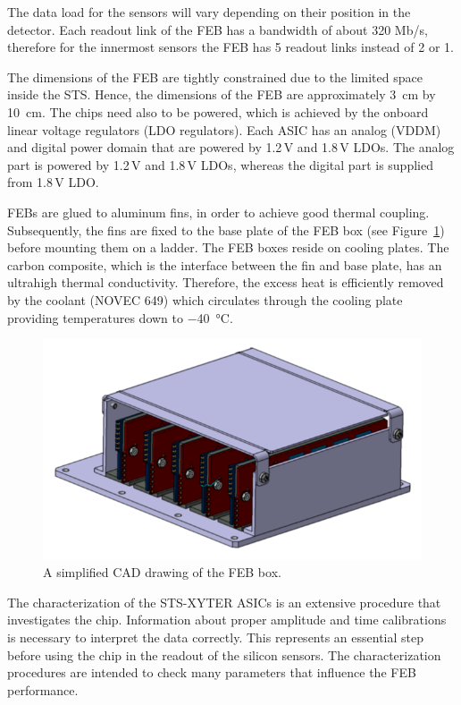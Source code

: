 The data load for the sensors will vary depending on their position in the detector. Each readout link of the \gls{FEB} has a bandwidth of about 320 Mb/s, therefore for the innermost sensors the \gls{FEB} has 5 readout links instead of 2 or 1. 

The dimensions of the \gls{FEB} are tightly constrained due to the limited space inside the \gls{STS}. Hence, the dimensions of the \gls{FEB} are approximately \SI{3}{\centi\metre} by \SI{10}{\centi\metre}. The chips need also to be powered, which is achieved by the onboard linear voltage regulators (\gls{LDO} regulators). Each \gls{ASIC} has an analog (VDDM) and digital power domain that are powered by 1.2\,V and 1.8\,V \glspl{LDO}. The analog part is powered by 1.2\,V and 1.8\,V \glspl{LDO}, whereas the digital part is supplied from 1.8\,V \gls{LDO}.

\glspl{FEB} are glued to aluminum fins, in order to achieve good thermal coupling. Subsequently, the fins are fixed to the base plate of the \gls{FEB} box (see Figure~\ref{feb_box}) before mounting them on a ladder. The \gls{FEB} boxes reside on cooling plates. The carbon composite, which is the interface between the fin and base plate, has an ultrahigh thermal conductivity. Therefore, the excess heat is efficiently removed by the coolant (NOVEC 649) which circulates through the cooling plate providing temperatures down to \SI{-40}{\celsius}. 

\begin{figure}[!h]
\centering
\includegraphics[width=0.55\columnwidth]{Chapter2/images/feb_box_1.png}
\caption{A simplified CAD drawing of the \gls{FEB} box.}
\label{feb_box}
\end{figure}


The characterization of the STS-XYTER ASICs is an extensive procedure that investigates the chip. Information about proper amplitude and time calibrations is necessary to interpret the data correctly. This represents an essential step before using the chip in the readout of the silicon sensors. The characterization procedures are intended to
check many parameters that influence the \gls{FEB} performance. 


